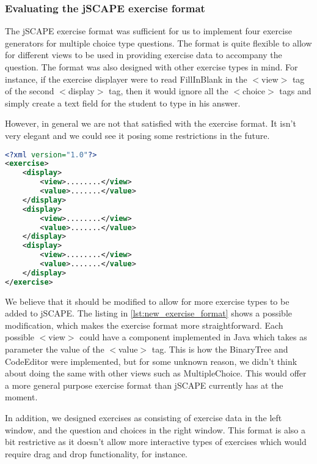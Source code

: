 \subsubsection{Evaluating the jSCAPE exercise format}
The jSCAPE exercise format was sufficient for us to implement four exercise generators for multiple choice type questions. The format is quite flexible to allow for different views to be used in providing exercise data to accompany the question. The format was also designed with other exercise types in mind. For instance, if the exercise displayer were to read \textsf{FillInBlank} in the \textsf{$<$view$>$} tag of the second \textsf{$<$display$>$} tag, then it would ignore all the \textsf{$<$choice$>$} tags and simply create a text field for the student to type in his answer. \newline

However, in general we are not that satisfied with the exercise format. It isn't very elegant and we could see it posing some restrictions in the future. \newline

\begin{lstlisting}[language=xml, caption={A modified exercise format.}, label=lst:new_exercise_format]
<?xml version="1.0"?>
<exercise>
	<display>
		<view>........</view>
		<value>.......</value>
	</display>
	<display>
		<view>........</view>
		<value>.......</value>
	</display>
	<display>
		<view>........</view>
		<value>.......</value>
	</display>
</exercise>
\end{lstlisting}

We believe that it should be modified to allow for more exercise types to be added to jSCAPE. The listing in \ref{lst:new_exercise_format} shows a possible modification, which makes the exercise format more straightforward. Each possible \textsf{$<$view$>$} could have a component implemented in Java which takes as parameter the value of the \textsf{$<$value$>$} tag. This is how the \textsf{BinaryTree} and \textsf{CodeEditor} were implemented, but for some unknown reason, we didn't think about doing the same with other views such as \textsf{MultipleChoice}. This would offer a more general purpose exercise format than jSCAPE currently has at the moment.\newline

In addition, we designed exercises as consisting of exercise data in the left window, and the question and choices in the right window. This format is also a bit restrictive as it doesn't allow more interactive types of exercises which would require drag and drop functionality, for instance.

